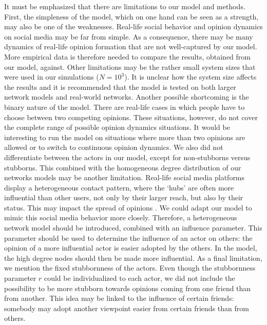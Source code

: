 \documentclass[11 pt , letterpaper , twoside , openright]{book}
\begin{document}
It must be emphasized that there are limitations to our model and methods. First, the simpleness of the model, which on one hand can be seen as a strength, may also be one of the weaknesses. Real-life social behavior and opinion dynamics on social media may be far from simple. As a consequence, there may be many dynamics of real-life opinion formation that are not well-captured by our model. More empirical data is therefore needed to compare the results, obtained from our model, against. Other limitations may be the rather small system sizes that were used in our simulations ($N = 10^3$). It is unclear how the system size affects the results and it is recommended that the model is tested on both larger network models and real-world networks. Another possible shortcoming is the binary nature of the model. There are real-life cases in which people have to choose between two competing opinions. These situations, however, do not cover the complete range of possible opinion dynamics situations. It would be interesting to run the model on situations where more than two opinions are allowed or to switch to continuous opinion dynamics. We also did not differentiate between the actors in our model, except for non-stubborns versus stubborns. This combined with the homogeneous degree distribution of our networks models may be another limitation. Real-life social media platforms display a heterogeneous contact pattern, where the `hubs' are often more influential than other users, not only by their larger reach, but also by their status. This may impact the spread of opinions \cite{Fan2020}\cite{Wang2019}. We could adapt our model to mimic this social media behavior more closely. Therefore, a heterogeneous network model should be introduced, combined with an influence parameter. This parameter should be used to determine the influence of an actor on others: the opinion of a more influential actor is easier adopted by the others. In the model, the high degree nodes should then be made more influential. As a final limitation, we mention the fixed stubbornness of the actors. Even though the stubbornness parameter $r$ could be individualized to each actor, we did not include the possibility to be more stubborn towards opinions coming from one friend than from another. This idea may be linked to the influence of certain friends: somebody may adopt another viewpoint easier from certain friends than from others.\\
\newline
\end{document}
